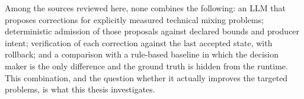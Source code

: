 Among the sources reviewed here, none combines the following: an \ac{LLM} that proposes corrections for explicitly measured technical mixing problems; deterministic admission of those proposals against declared bounds and producer intent; verification of each correction against the last accepted state, with rollback; and a comparison with a rule-based baseline in which the decision maker is the only difference and the ground truth is hidden from the runtime. This combination, and the question whether it actually improves the targeted problems, is what this thesis investigates.

